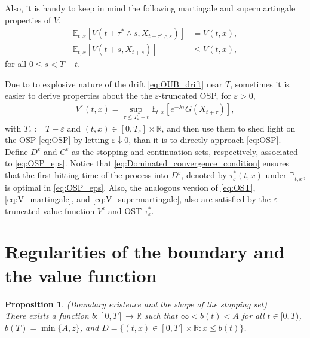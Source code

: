 \documentclass{tufte-handout}
\newcommand{\E}{\mathbb{E}} %
\renewcommand{\Pr}{\mathbb{P}} %
\newcommand{\R}{\mathbb{R}} %
\newtheorem{pr}{Proposition}
\begin{document}
	Also, it is handy to keep in mind the following martingale and supermartingale properties of $V$,
	\begin{align}
	\E_{t, x}\left[V(t + \tau^*\wedge s, X_{t + \tau^*\wedge s})\right] &=  V(t, x), \label{eq:V_martingale} \\
	\E_{t, x}\left[V(t + s, X_{t + s})\right] &\leq V(t, x), \label{eq:V_supermartingale}
	\end{align}	
	for all $0 \leq s < T - t.$
	
	Due to to explosive nature of the drift \eqref{eq:OUB_drift} near $T$, sometimes it is easier to derive properties about the the $\varepsilon$-truncated OSP, for $\varepsilon > 0$,
	\begin{align}\label{eq:OSP_eps}
	V^{\varepsilon}(t, x) = \sup_{\tau \leq T_\varepsilon - t}\E_{t, x}\left[e^{-\lambda\tau}G(X_{t + \tau})\right],
	\end{align}
	with $T_\varepsilon := T - \varepsilon$ and $(t, x) \in [0, T_\varepsilon]\times\R$, and then use them to shed light on the OSP \eqref{eq:OSP} by letting $\varepsilon \downarrow 0$, than it is to directly approach \eqref{eq:OSP}. Define $D^\varepsilon$ and $C^\varepsilon$ as the stopping and continuation sets, respectively, associated to \eqref{eq:OSP_eps}. Notice that \eqref{eq:Dominated_convergence_condition} ensures that the first hitting time of the process into $D^\varepsilon$, denoted by $\tau_\varepsilon^*(t, x)$ under $\Pr_{t, x}$, is optimal in \eqref{eq:OSP_eps}. Also, the analogous version of \eqref{eq:OST}, \eqref{eq:V_martingale}, and \eqref{eq:V_supermartingale}, also are satisfied by the $\varepsilon$-truncated value function $V^\varepsilon$ and OST $\tau_\varepsilon^*$. 
	
	\section{Regularities of the boundary and the value function}
	
	\begin{pr}\label{pr:boundary_existence}(Boundary existence and the shape of the stopping set)\\
		There exists a function $b:[0, T]\rightarrow\mathbb{R}$ such that $\infty < b(t) < A$ for all $t\in[0, T)$, $b(T) = \min\{A, z\}$, and $D = \{(t, x)\in[0, T]\times\mathbb{R} : x \leq b(t)\}$.
	\end{pr}
	
\end{document}
